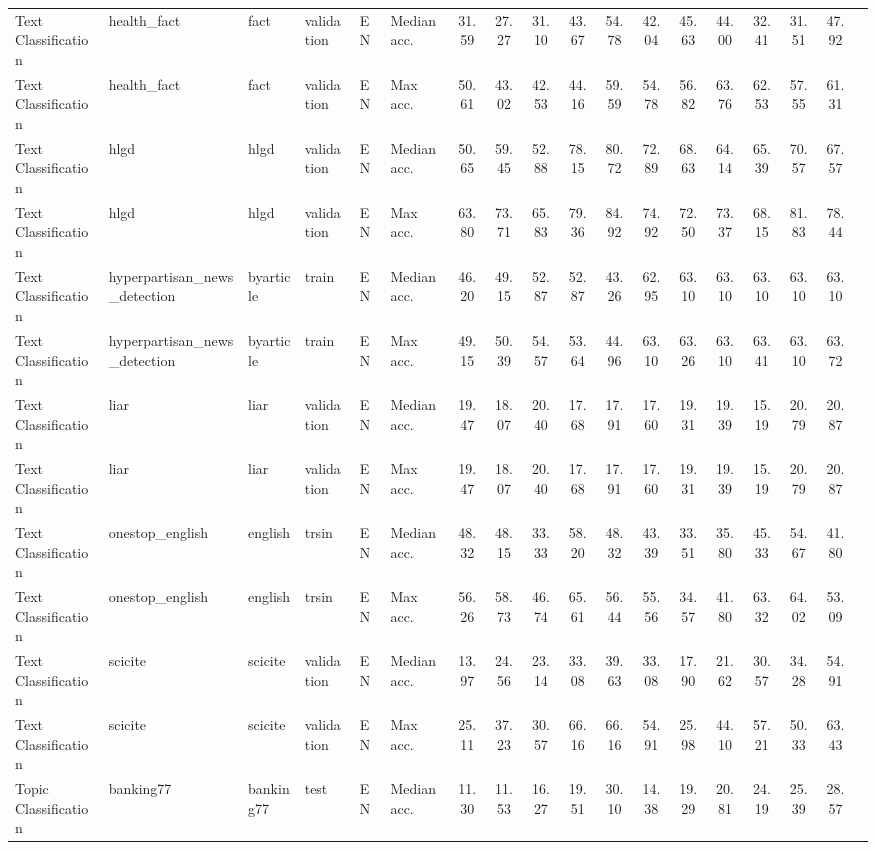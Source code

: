 \documentclass[11pt]{article}
\begin{document}
\begin{table*}[ht]
\begin{minipage}{\pdfpagewidth}
{\begin{tabular}{llllll|ccccc|ccccccc}
Text Classification & health\_fact & fact & validation & EN & Median acc. & 31.59 & 27.27 & 31.10 & 43.67 & 54.78 & 42.04 & 45.63 & 44.00 & 32.41 & 31.51 & 47.92\\
Text Classification & health\_fact & fact & validation & EN & Max acc. & 50.61 & 43.02 & 42.53 & 44.16 & 59.59 & 54.78 & 56.82 & 63.76 & 62.53 & 57.55 & 61.31\\
Text Classification & hlgd & hlgd & validation & EN & Median acc. & 50.65 & 59.45 & 52.88 & 78.15 & 80.72 & 72.89 & 68.63 & 64.14 & 65.39 & 70.57 & 67.57\\
Text Classification & hlgd & hlgd & validation & EN & Max acc. & 63.80 & 73.71 & 65.83 & 79.36 & 84.92 & 74.92 & 72.50 & 73.37 & 68.15 & 81.83 & 78.44\\
Text Classification & hyperpartisan\_news\_detection & byarticle & train & EN & Median acc. & 46.20 & 49.15 & 52.87 & 52.87 & 43.26 & 62.95 & 63.10 & 63.10 & 63.10 & 63.10 & 63.10\\
Text Classification & hyperpartisan\_news\_detection & byarticle & train & EN & Max acc. & 49.15 & 50.39 & 54.57 & 53.64 & 44.96 & 63.10 & 63.26 & 63.10 & 63.41 & 63.10 & 63.72\\
Text Classification & liar & liar & validation & EN & Median acc. & 19.47 & 18.07 & 20.40 & 17.68 & 17.91 & 17.60 & 19.31 & 19.39 & 15.19 & 20.79 & 20.87\\
Text Classification & liar & liar & validation & EN & Max acc. & 19.47 & 18.07 & 20.40 & 17.68 & 17.91 & 17.60 & 19.31 & 19.39 & 15.19 & 20.79 & 20.87\\
Text Classification & onestop\_english & english & trsin & EN & Median acc. & 48.32 & 48.15 & 33.33 & 58.20 & 48.32 & 43.39 & 33.51 & 35.80 & 45.33 & 54.67 & 41.80\\
Text Classification & onestop\_english & english & trsin & EN & Max acc. & 56.26 & 58.73 & 46.74 & 65.61 & 56.44 & 55.56 & 34.57 & 41.80 & 63.32 & 64.02 & 53.09\\
Text Classification & scicite & scicite & validation & EN & Median acc. & 13.97 & 24.56 & 23.14 & 33.08 & 39.63 & 33.08 & 17.90 & 21.62 & 30.57 & 34.28 & 54.91\\
Text Classification & scicite & scicite & validation & EN & Max acc. & 25.11 & 37.23 & 30.57 & 66.16 & 66.16 & 54.91 & 25.98 & 44.10 & 57.21 & 50.33 & 63.43\\
\midrule
Topic Classification & banking77 & banking77 & test & EN & Median acc. & 11.30 & 11.53 & 16.27 & 19.51 & 30.10 & 14.38 & 19.29 & 20.81 & 24.19 & 25.39 & 28.57\\

\end{tabular}}
\end{minipage}
\end{table*}
\end{document}
